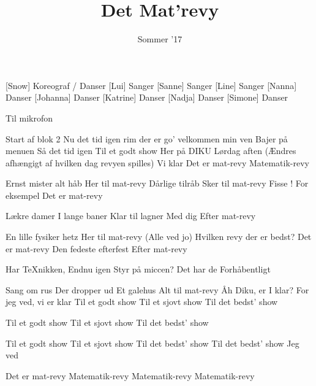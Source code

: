 \documentclass[a4paper,11pt]{article}
\title{Det Mat'revy}
\author{Sommer '17}
\begin{document}
\maketitle

\begin{roles}
[Snow] Koreograf / Danser
[Lui] Sanger
[Sanne] Sanger
[Line] Sanger
[Nanna] Danser
[Johanna] Danser
[Katrine] Danser
[Nadja] Danser
[Simone] Danser
\end{roles}

\begin{props}
 Til mikrofon
\end{props}

\begin{song}
 Start af blok 2
Nu det tid igen
rim der er go'
velkommen min ven
Bajer på menuen
Så det tid igen
Til et godt show
Her på DIKU
Lørdag aften (Ændres afhængigt af hvilken dag revyen spilles)
Vi klar
Det er mat-revy
Matematik-revy

 Ernst mister alt håb
Her til mat-revy
Dårlige tilråb
Sker til mat-revy
Fisse ! For eksempel
Det er mat-revy

 Lækre damer
I lange baner
Klar til lagner
Med dig
Efter mat-revy

 En lille fysiker hetz
Her til mat-revy (Alle ved jo)
Hvilken revy der er bedst?
Det er mat-revy
Den fedeste efterfest
Efter mat-revy

 Har TeXnikken,
Endnu igen
Styr på miccen?
Det har de
Forhåbentligt

 Sang om rus
Der dropper ud
Et galehus
Alt til mat-revy
Åh Diku, er I klar?
For jeg ved, vi er klar
Til et godt show
Til et sjovt show
Til det bedst' show

 Til et godt show
Til et sjovt show
Til det bedst' show

 Til et godt show
Til et sjovt show
Til det bedst' show
Til det bedst' show
Jeg ved

 Det er mat-revy
Matematik-revy
Matematik-revy
Matematik-revy
\end{song}
\end{document}
